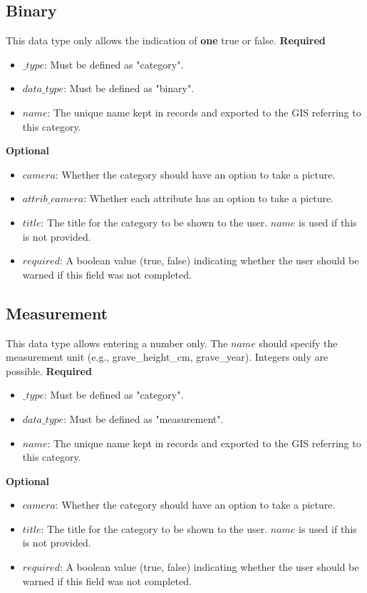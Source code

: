 \documentclass{scrreprt}
\begin{document}
\subsection{Binary}
This data type only allows the indication of \textbf{one} true or false.
\textbf{Required}
\begin{itemize}
\item $\_type$:  Must be defined as "category".
\item $data\_type$: Must be defined as "binary".
\item $name$: The unique name kept in records and exported to the GIS referring to this category.
\end{itemize}
\textbf{Optional}
\begin{itemize}
\item $camera$: Whether the category should have an option to take a picture.
\item $attrib\_camera$: Whether each attribute has an option to take a picture.
\item $title$: The title for the category to be shown to the user. $name$ is used if this is not provided.
\item $required$: A boolean value (true, false) indicating whether the user should be warned if this field was not completed.
\end{itemize}

\newpage
\subsection{Measurement}
This data type allows entering a number only. The $name$ should specify the measurement unit (e.g., grave_height_cm, grave_year). Integers only are possible.
\textbf{Required}
\begin{itemize}
\item $\_type$:  Must be defined as "category".
\item $data\_type$: Must be defined as "measurement".
\item $name$: The unique name kept in records and exported to the GIS referring to this category.
\end{itemize}
\textbf{Optional}
\begin{itemize}
\item $camera$: Whether the category should have an option to take a picture.
\item $title$: The title for the category to be shown to the user. $name$ is used if this is not provided.
\item $required$: A boolean value (true, false) indicating whether the user should be warned if this field was not completed.
\end{itemize}
\end{document}
